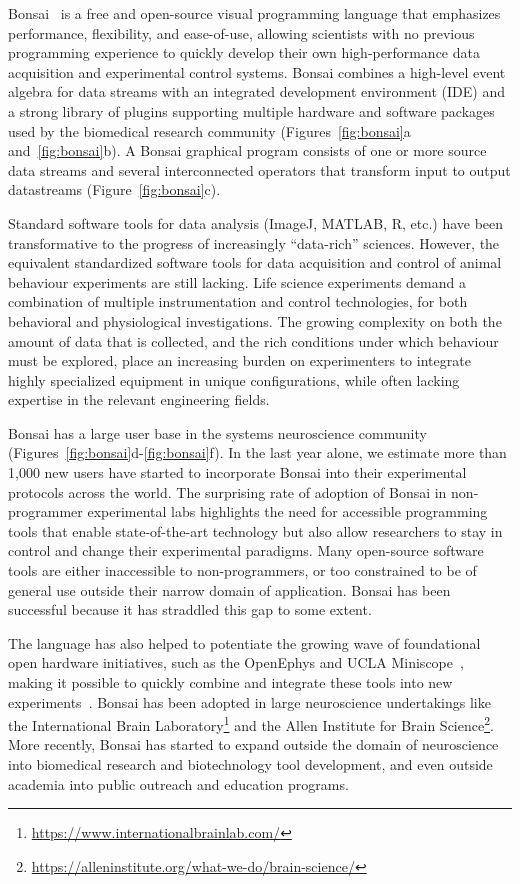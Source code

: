 
Bonsai~\citep{lopesEtAl15,lopesAndMonteiro21} is a free and open-source visual
programming language that emphasizes performance, flexibility, and ease-of-use,
allowing scientists with no previous programming experience to quickly develop
their own high-performance data acquisition and experimental control systems.
Bonsai combines a high-level event algebra for data streams with an integrated
development environment (IDE) and a strong library of plugins supporting
multiple hardware and software packages used by the biomedical research
community (Figures~\ref{fig:bonsai}a and~\ref{fig:bonsai}b).
%
A Bonsai graphical program consists of one or more source data streams
and several interconnected operators that transform input to output
datastreams (Figure~\ref{fig:bonsai}c).

Standard software tools for data analysis (ImageJ, MATLAB, R, etc.) have been
transformative to the progress of increasingly “data-rich” sciences. However,
the equivalent standardized software tools for data acquisition and control of
animal behaviour experiments are still lacking. Life science experiments demand
a combination of multiple instrumentation and control technologies, for both
behavioral and physiological investigations. The growing complexity on both the
amount of data that is collected, and the rich conditions under which behaviour
must be explored, place an increasing burden on experimenters to integrate
highly specialized equipment in unique configurations, while often lacking
expertise in the relevant engineering fields.

Bonsai has a large user base in the systems neuroscience community
(Figures~\ref{fig:bonsai}d-\ref{fig:bonsai}f).  In the last year alone, we estimate more than 1,000 new users have
started to incorporate Bonsai into their experimental protocols across the
world. The surprising rate of adoption of Bonsai in non-programmer experimental
labs highlights the need for accessible programming tools that enable
state-of-the-art technology but also allow researchers to stay in control and
change their experimental paradigms.  Many open-source software tools are
either inaccessible to non-programmers, or too constrained to be of general use
outside their narrow domain of application. Bonsai has been successful because
it has straddled this gap to some extent.

The language has also helped to potentiate the growing wave of foundational
open hardware initiatives, such as the OpenEphys \citep{siegleEtAl17} and UCLA
Miniscope~\citep{caiEtAl16}, making it possible to quickly combine and
integrate these tools into new experiments~\citep{buccinoEtAl18}.
%
Bonsai has been adopted in large neuroscience undertakings like the
International Brain
Laboratory\footnote{\href{https://www.internationalbrainlab.com/}{https://www.internationalbrainlab.com/}}
and the Allen Institute for Brain
Science\footnote{\href{https://alleninstitute.org/what-we-do/brain-science/}{https://alleninstitute.org/what-we-do/brain-science/}}.
%
More recently, Bonsai has started to expand outside the domain of neuroscience
into biomedical research and biotechnology tool development, and even outside
academia into public outreach and education programs.

